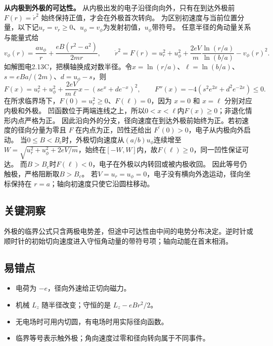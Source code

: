 \documentclass[UTF8,fontset=fandol,a4paper,11pt]{ctexart}
\begin{document}
\textbf{从内极到外极的可达性。} 从内极出发的电子沿径向向外，只有在到达外极前 $F(r)=\dot r^2$ 始终保持正值，才会在外极首次转向。
为区别初速度与当前位置分量，以下记$u_r=v_r\ge0$、$u_\phi=v_\phi$为发射初值，$u_\phi$带符号。
任意半径的角动量关系与能量式给
\[
v_\phi(r)=\frac{au_\phi}{r}+\frac{eB(r^2-a^2)}{2mr},\qquad
\dot r^2=F(r)=u_r^2+u_\phi^2+\frac{2eV}{m}\frac{\ln(r/a)}{\ln(b/a)}-v_\phi(r)^2.
\]
如解图电2.13C，把横轴换成对数半径。令$x=\ln(r/a)$、$\ell=\ln(b/a)$、$s=eBa/(2m)$、$d=u_\phi-s$，则
\[
F(x)=u_r^2+u_\phi^2+\frac{2eV}{m\ell}x-(s e^x+d e^{-x})^2,\qquad
F''(x)=-4(s^2e^{2x}+d^2e^{-2x})\le0.
\]
在所求临界场下，$F(0)=u_r^2\ge0$、$F(\ell)=0$，因为 $x=0$ 和 $x=\ell$ 分别对应内极和外极。
凹函数位于两端连线之上，所以$0<x<\ell$内$F(x)\ge0$；非退化情形内点严格为正。
因此沿向外的分支，径向速度在到达外极前始终为正。若初速度的径向分量为零且 $F$ 在内点为正，凹性还给出 $F^{\prime}(0)>0$，电子从内极向外启动。
当$0\le B<B_c$时，外极切向速度从$(a/b)u_\phi$连续增至
$W=\sqrt{u_r^2+u_\phi^2+2eV/m}$，始终在$[-W,W]$内，故$F(\ell)\ge0$，同一凹性保证可达。
而$B>B_c$时$F(\ell)<0$，电子在外极以内转回或被内极收回。
因此等号仍触极，严格阻断取$B>B_c$。
若$V=u_r=u_\phi=0$，电子没有横向外逸运动，径向坐标保持在 $r=a$；轴向初速度只使它沿圆柱移动。




\subsection*{关键洞察}

外极的临界公式只含两极电势差，但途中可达性由中间的电势分布决定。逆时针或顺时针的初始切向速度进入守恒角动量的带符号项；轴向动能在首末相消。



\subsection*{易错点}

\begin{itemize}
\item 电荷为 $-e$，径向外速给正切向磁力。
\item 机械 $L_z$ 随半径改变；守恒的是 $L_z-eBr^2/2$。
\item 无电场时可用内切圆，有电场时用实际径向函数。
\item 临界等号表示触外极；角向速度过零和径向转向属于不同事件。
\end{itemize}
\end{document}
